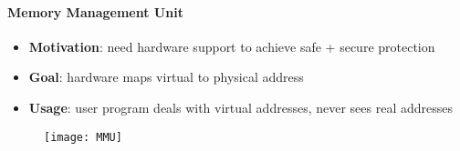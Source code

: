 \paragraph{Memory Management Unit}
\begin{itemize}
  \item \textbf{Motivation}: need hardware support to achieve safe + secure protection
  \item \textbf{Goal}: hardware maps virtual to physical address
  \item \textbf{Usage}: user program deals with virtual addresses, never sees real addresses
\end{itemize}
\begin{figure}[h]\centering\label{MMU}\texttt{[image: MMU]}\end{figure}

